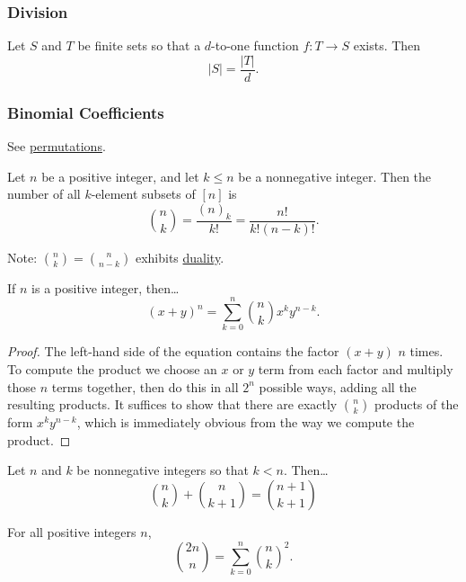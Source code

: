 \subsubsection{Division}\label{division}

\begin{theorem}
Let $S$ and $T$ be finite sets so that a $d$-to-one function $f : T \rightarrow S$ exists. Then
$$|S| = \frac{|T|}{d}.$$
\end{theorem}

\subsubsection{Binomial Coefficients}\label{binomials}

See \hyperref[permutation]{permutations}.

\begin{theorem}
Let $n$ be a positive integer, and let $k \leq n$ be a nonnegative integer. Then the number of all $k$-element subsets of $[n]$ is
$${n \choose k} = \frac{(n)_k}{k!} = \frac{n!}{k!(n-k)!}.$$
\end{theorem}

Note: ${n \choose k} = {n \choose n-k}$ exhibits \hyperref[duality]{duality}.

\begin{theorem}\label{binomialtheorem}
If $n$ is a positive integer, then\dots
$$(x+y)^n = \sum_{k=0}^n {n \choose k} x^k y^{n-k}.$$ 
\end{theorem}

\begin{proof}
The left-hand side of the equation contains the factor $(x + y)$ $n$ times. To compute the product we choose an $x$ or $y$ term from each factor and multiply those $n$ terms together, then do this
in all $2^n$ possible ways, adding all the resulting products. It suffices to show that there are exactly ${n \choose k}$ products of the form $x^k y^{n-k}$, which is immediately obvious from the
way we compute the product.
\end{proof}

\begin{theorem}
Let $n$ and $k$ be nonnegative integers so that $k < n.$ Then\dots
$${n \choose k} + {n \choose k + 1} = {n + 1 \choose k + 1}$$
\end{theorem}

\begin{theorem}
For all positive integers $n$,
$${2n \choose n} = \sum^n_{k=0}{n \choose k}^2.$$
\end{theorem}

